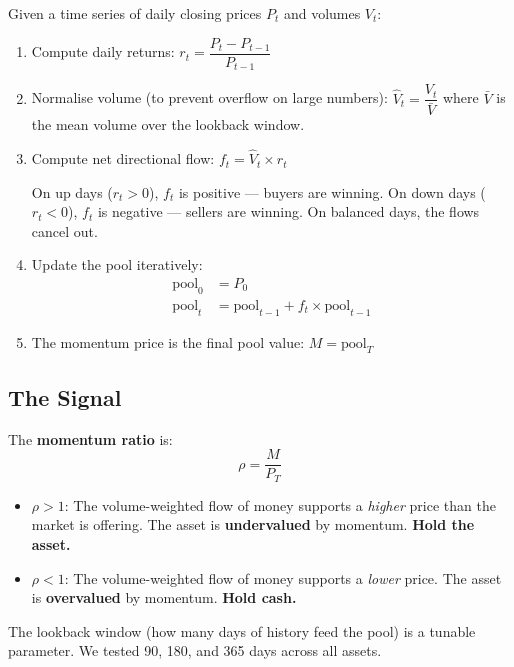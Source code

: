 \documentclass[11pt,a4paper]{article}
\begin{document}
Given a time series of daily closing prices $P_t$ and volumes $V_t$:

\begin{enumerate}[leftmargin=2em]
    \item Compute daily returns:
          $r_t = \dfrac{P_t - P_{t-1}}{P_{t-1}}$

    \item Normalise volume (to prevent overflow on large numbers):
          $\hat{V}_t = \dfrac{V_t}{\bar{V}}$
          where $\bar{V}$ is the mean volume over the lookback window.

    \item Compute net directional flow:
          $f_t = \hat{V}_t \times r_t$

          On up days ($r_t > 0$), $f_t$ is positive --- buyers are winning.
          On down days ($r_t < 0$), $f_t$ is negative --- sellers are winning.
          On balanced days, the flows cancel out.

    \item Update the pool iteratively:
          \begin{align*}
              \text{pool}_0 &= P_0 \\
              \text{pool}_t &= \text{pool}_{t-1} + f_t \times \text{pool}_{t-1}
          \end{align*}

    \item The momentum price is the final pool value:
          $M = \text{pool}_T$
\end{enumerate}

\subsection{The Signal}

The \textbf{momentum ratio} is:
$$\rho = \frac{M}{P_T}$$

\begin{itemize}[leftmargin=2em]
    \item $\rho > 1$: The volume-weighted flow of money supports a
          \emph{higher} price than the market is offering. The asset is
          \textbf{undervalued} by momentum. \textbf{Hold the asset.}
    \item $\rho < 1$: The volume-weighted flow of money supports a
          \emph{lower} price. The asset is \textbf{overvalued} by
          momentum. \textbf{Hold cash.}
\end{itemize}

The lookback window (how many days of history feed the pool) is a
tunable parameter. We tested 90, 180, and 365 days across all assets.
\end{document}
